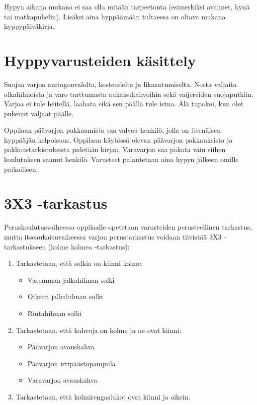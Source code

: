 Hypyn aikana mukana ei saa olla mitään tarpeetonta (esimerkiksi avaimet, kynä tai matkapuhelin). Lisäksi aina hyppäämään tultaessa on oltava mukana hyppypäiväkirja. 

\section{ Hyppyvarusteiden käsittely }
\label{laskuvarjokalusto-ja-hyppyvarusteet-hyppyvarusteiden-kasittely}


Suojaa varjoa auringonvalolta, kosteudelta ja likaantumiselta. Nosta valjaita olkahihnoista ja varo tarttumasta aukaisukahvoihin sekä vaijereiden suojaputkiin. Varjoa ei tule heitellä, laahata eikä sen päällä tule istua. Älä tupakoi, kun olet pukenut valjaat päälle. 


Oppilaan päävarjon pakkaamista saa valvoa henkilö, jolla on itsenäisen hyppääjän kelpoisuus. Oppilaan käytössä olevan päävarjon pakkauksista ja pakkaustarkistuksista pidetään kirjaa. Varavarjon saa pakata vain siihen koulutuksen saanut henkilö. Varusteet palautetaan aina hypyn jälkeen omille paikoilleen. 

\section{ 3X3 -tarkastus }
\label{laskuvarjokalusto-ja-hyppyvarusteet-3x3-tarkastus}


Peruskoulutusvaiheessa oppilaalle opetetaan varusteiden perusteellinen tarkastus, mutta itseaukaisuvaiheessa varjon perustarkastus voidaan tiivistää 3X3 -tarkastukseen (kolme kolmea -tarkastus): 

\begin{enumerate}[label=\bfseries \arabic*)]
\item  Tarkastetaan, että solkia on kiinni kolme: 
	\begin{itemize}
	\item  Vasemman jalkahihnan solki 
	\item  Oikean jalkahihnan solki 
	\item  Rintahihnan solki 
	\end{itemize}
\item  Tarkastetaan, että kahvoja on kolme ja ne ovat kiinni: 
	\begin{itemize}
	\item  Päävarjon avauskahva 
	\item  Päävarjon irtipäästöpampula 
	\item  Varavarjon avauskahva 
	\end{itemize}
\item  Tarkastetaan, että kolmirengaslukot ovat kiinni ja oikein. 
\end{enumerate}
